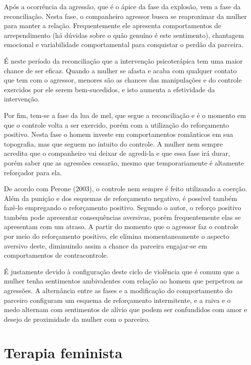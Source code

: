 Após a ocorrência da agressão, que é o ápice da fase da explosão, vem a fase da reconciliação. Nesta fase, o companheiro agressor busca se reaproximar da mulher para manter a relação. Frequentemente ele apresenta comportamentos de arrependimento (há dúvidas sobre o quão genuíno é este sentimento), chantagem emocional e variabilidade comportamental para conquistar o perdão da parceira.

É neste período da reconciliação que a intervenção psicoterápica tem uma maior chance de ser eficaz. Quando a mulher se afasta e acaba com qualquer contato que tem com o agressor, menores são as chances das manipulações e do controle exercidos por ele serem bem-sucedidos, e isto aumenta a efetividade da intervenção.

Por fim, tem-se a fase da lua de mel, que segue a reconciliação e é o momento em que o controle volta a ser exercido, porém com a utilização do reforçamento positivo. Nesta fase o homem investe em comportamentos românticos em sua topografia, mas que seguem no intuito do controle. A mulher nem sempre acredita que o companheiro vai deixar de agredi-la e que essa fase irá durar, porém saber que as agressões cessarão, mesmo que temporariamente é altamente reforçador para ela.

De acordo com Perone (2003), o controle nem sempre é feito utilizando a coerção. Além da punição e dos esquemas de reforçamento negativo, é possível também fazê-lo empregando o reforçamento positivo. Segundo o autor, o reforço positivo também pode apresentar consequências aversivas, porém frequentemente elas se apresentam com um atraso. A partir do momento que o agressor faz o controle por meio do reforçamento positivo, ele elimina momentaneamente o aspecto aversivo deste, diminuindo assim a chance da parceira engajar-se em comportamentos de contracontrole.

É justamente devido à configuração deste ciclo de violência que é comum que a mulher tenha sentimentos ambivalentes com relação ao homem que perpetrou as agressões. A alternância entre as fases e a modificação do comportamento do parceiro configuram um esquema de reforçamento intermitente, e a raiva e o medo alternam com sentimentos de alívio que podem ser confundidos com amor e desejo de proximidade da mulher com o parceiro.

\section{Terapia feminista}

